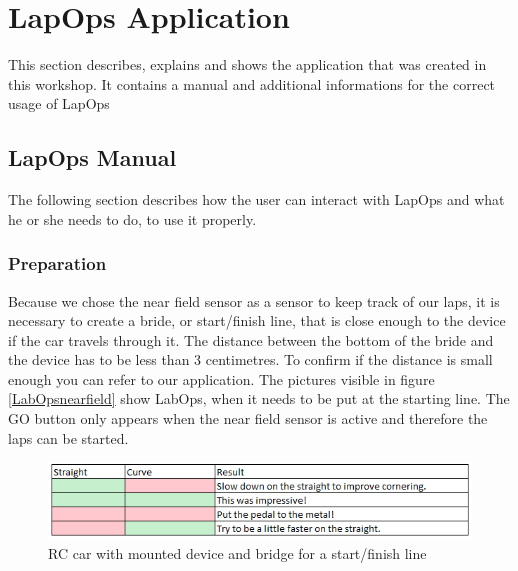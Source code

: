 \chapter{LapOps Application}
This section describes, explains and shows the application that was created in this workshop. It contains a manual and additional informations for the correct usage of LapOps

\section{LapOps Manual}
The following section describes how the user can interact with LapOps and what he or she needs to do, to use it properly.

\subsection{Preparation}
Because we chose the near field sensor as a sensor to keep track of our laps, it is necessary to create a bride, or start/finish line, that is close enough to the device if the car travels through it. The distance between the bottom of the bride and the device has to be less than 3 centimetres. To confirm if the distance is small enough you can refer to our application. The pictures visible in figure \ref{LabOpsnearfield} show LabOps, when it needs to be put at the starting line. The GO button only appears when the near field sensor is active and therefore the laps can be started.

\begin{figure}[H]
	\centering
	\includegraphics[scale= 0.9]{Pictures/StraightResultMapping.png}
	\caption{RC car with mounted device and bridge for a start/finish line}
	\label{startFinishLineWithRC}
\end{figure}

